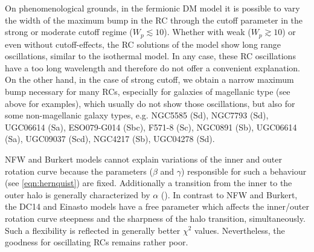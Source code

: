 On phenomenological grounds, in the fermionic DM model it is possible to vary the width of the maximum bump in the RC through the cutoff parameter in the strong or moderate cutoff regime ($W_p \lesssim 10$). Whether with weak ($W_p \gtrsim 10$) or even without cutoff-effects, the RC solutions of the model show long range oscillations, similar to the isothermal model. In any case, these RC oscillations have a too long wavelength and therefore do not offer a convenient explanation. On the other hand, in the case of strong cutoff, we obtain a narrow maximum bump necessary for many RCs, especially for galaxies of magellanic type (see above for examples), which usually do not show those oscillations, but also for some non-magellanic galaxy types, e.g. NGC5585 (Sd), NGC7793 (Sd), UGC06614 (Sa), ESO079-G014 (Sbc), F571-8 (Sc), NGC0891 (Sb), UGC06614 (Sa), UGC09037 (Scd), NGC4217 (Sb), UGC04278 (Sd).

NFW and Burkert models cannot explain variations of the inner and outer rotation curve because the parameters ($\beta$ and $\gamma$) responsible for such a behaviour (see \cref{eqn:hernquist}) are fixed. Additionally a transition from the inner to the outer halo is generally characterized by $\alpha$ (). In contrast to NFW and Burkert, the DC14 and Einasto models have a free parameter which affects the inner/outer rotation curve steepness and the sharpness of the halo transition, simultaneously. Such a flexibility is reflected in generally better $\chi^2$ values. Nevertheless, the goodness for oscillating RCs remains rather poor.
